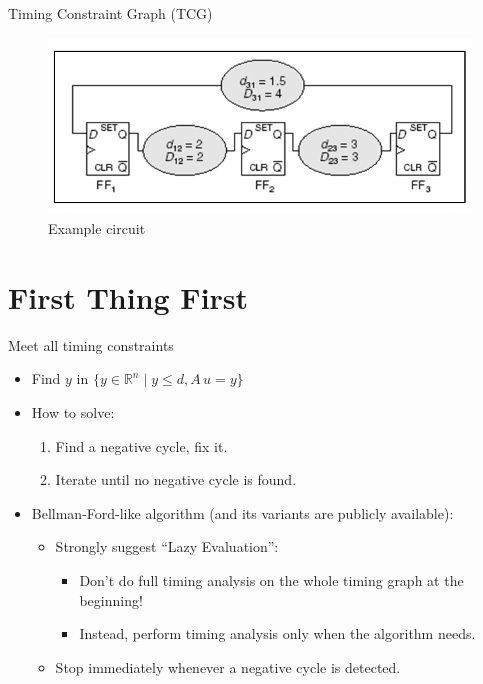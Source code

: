 \documentclass[
  ignorenonframetext,
]{beamer}
\providecommand{\tightlist}{%
  \setlength{\itemsep}{0pt}\setlength{\parskip}{0pt}}
\begin{document}
\begin{frame}{Timing Constraint Graph (TCG)}
\protect\hypertarget{timing-constraint-graph-tcg}{}
\columnsbegin
{}

\begin{figure}
\centering
\includegraphics{lec05.files/fig05.png}
\caption{Example circuit}
\end{figure}


\begin{figure}[h!]
\centering

\end{figure}
\columnsend
\end{frame}

\hypertarget{first-thing-first}{%
\section{First Thing First}\label{first-thing-first}}

\begin{frame}{Meet all timing constraints}
\protect\hypertarget{meet-all-timing-constraints}{}
\begin{itemize}
\tightlist
\item
  Find \(y\) in \(\{y \in \mathbb{R}^n \mid y \leq d, A\,u = y\}\)
\item
  How to solve:

  \begin{enumerate}
  \tightlist
  \item
    Find a negative cycle, fix it.
  \item
    Iterate until no negative cycle is found.
  \end{enumerate}
\item
  Bellman-Ford-like algorithm (and its variants are publicly available):

  \begin{itemize}
  \tightlist
  \item
    Strongly suggest ``Lazy Evaluation'':

    \begin{itemize}
    \tightlist
    \item
      Don't do full timing analysis on the whole timing graph at the
      beginning!
    \item
      Instead, perform timing analysis only when the algorithm needs.
    \end{itemize}
  \item
    Stop immediately whenever a negative cycle is detected.
  \end{itemize}
\end{itemize}
\end{frame}
\end{document}
